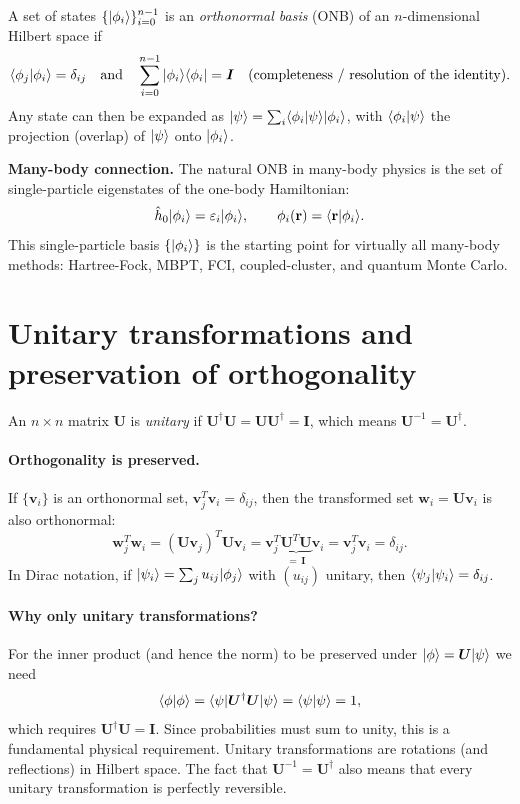 A set of states $\{\vert \phi_i \rangle\}_{i=0}^{n-1}$ is an
\emph{orthonormal basis} (ONB) of an $n$-dimensional Hilbert space if
\[
  \langle \phi_j \vert \phi_i \rangle=\delta_{ij}
  \quad\text{and}\quad
  \sum_{i=0}^{n-1}\vert \phi_i \rangle\langle \phi_i \vert=\bm{I}
  \quad\text{(completeness / resolution of the identity)}.
\]
Any state can then be expanded as
$\vert \psi \rangle=\sum_i\langle \phi_i \vert \psi \rangle\vert \phi_i \rangle$,
with $\langle \phi_i \vert \psi \rangle$ the projection (overlap) of $\vert \psi \rangle$
onto $\vert \phi_i \rangle$.

\begin{notebox}
\textbf{Many-body connection.} The natural ONB in many-body physics
is the set of single-particle eigenstates of the one-body Hamiltonian:
\[
  \hat{h}_0\vert \phi_i \rangle=\varepsilon_i\vert \phi_i \rangle,
  \qquad
  \phi_i(\mathbf{r})=\langle \mathbf{r} \vert \phi_i \rangle.
\]
This single-particle basis $\{\vert \phi_i \rangle\}$ is the starting point
for virtually all many-body methods: Hartree-Fock, MBPT, FCI,
coupled-cluster, and quantum Monte Carlo.
\end{notebox}

\section{Unitary transformations and preservation of orthogonality}
\label{sec:unitary}

An $n\times n$ matrix $\bm{U}$ is \emph{unitary} if
$\bm{U}^{\dagger}\bm{U}=\bm{U}\bm{U}^{\dagger}=\bm{I}$, which means
$\bm{U}^{-1}=\bm{U}^{\dagger}$.

\paragraph{Orthogonality is preserved.}
If $\{\bm{v}_i\}$ is an orthonormal set, $\bm{v}_j^T\bm{v}_i=\delta_{ij}$,
then the transformed set $\bm{w}_i=\bm{U}\bm{v}_i$ is also orthonormal:
\[
  \bm{w}_j^T\bm{w}_i
  =(\bm{U}\bm{v}_j)^T\bm{U}\bm{v}_i
  =\bm{v}_j^T\underbrace{\bm{U}^T\bm{U}}_{=\,\bm{I}}\bm{v}_i
  =\bm{v}_j^T\bm{v}_i=\delta_{ij}.
\]
In Dirac notation, if $\vert \psi_i \rangle=\sum_j u_{ij}\vert \phi_j \rangle$
with $(u_{ij})$ unitary, then $\langle \psi_j \vert \psi_i \rangle=\delta_{ij}$.

\paragraph{Why only unitary transformations?}
For the inner product (and hence the norm) to be preserved under
$\vert \phi \rangle=\bm{U}\vert \psi \rangle$ we need
\[
  \langle \phi \vert \phi \rangle
  =\langle \psi \vert\bm{U}^{\dagger}\bm{U}\vert \psi \rangle
  =\langle \psi \vert \psi \rangle=1,
\]
which requires $\bm{U}^{\dagger}\bm{U}=\bm{I}$.  Since probabilities
must sum to unity, this is a fundamental physical requirement.
Unitary transformations are rotations (and reflections) in Hilbert
space.  The fact that $\bm{U}^{-1}=\bm{U}^{\dagger}$ also means that
every unitary transformation is perfectly reversible.

